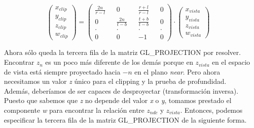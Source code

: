 \begin{figure}[h]
  \[
  \begin{pmatrix}
    x_{clip} \\ y_{clip} \\ z_{clip} \\ w_{clip}
  \end{pmatrix}
  =
  \begin{pmatrix}
    \frac{2n}{r-l} &&              0 && \frac{r+l}{r-l} &&     0 \\
                 0 && \frac{2n}{t-b} && \frac{t+b}{t-b} &&     0 \\
             \cdot &&          \cdot &&           \cdot && \cdot \\
                 0 &&              0 &&              -1 &&     0
  \end{pmatrix}
  \cdot
  \begin{pmatrix}
    x_{vista} \\ y_{vista} \\ z_{vista} \\ w_{vista}
  \end{pmatrix}
  \]
\end{figure}

\newpage

Ahora sólo queda la tercera fila de la matriz GL\_PROJECTION por resolver. Encontrar $z_n$ es un poco más diferente de los demás porque en $z_{vista}$ en el espacio de vista está siempre proyectado hacia $-n$ en el plano \textit{near}. Pero ahora necesitamos un valor \textit{z} único para el clipping y la prueba de profundidad. Además, deberíamos de ser capaces de desproyectar (transformación inversa). Puesto que sabemos que \textit{z} no depende del valor \textit{x} o \textit{y}, tomamos prestado el componente \textit{w} para encontrar la relación entre $z_{ndc}$ y $z_{vista}$. Entonces, podemos especificar la tercera fila de la matriz GL\_PROJECTION de la siguiente forma.


